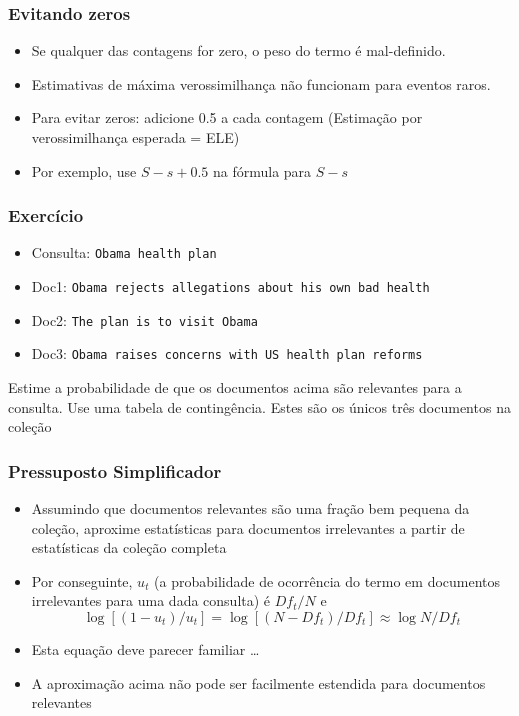 \documentclass[compress]{beamer}
\def\myblue#1{\textcolor{texblue}{#1}}
\begin{document}
\begin{frame}[<+->]
\frametitle{Evitando zeros}
\pause[2]

\begin{itemize}
\item Se qualquer das contagens for zero, o peso do termo é mal-definido.
\item Estimativas de máxima verossimilhança não funcionam para eventos raros.
\item Para evitar zeros: \myblue{adicione 0.5 a cada contagem}
  (Estimação por verossimilhança esperada = ELE)
\item Por exemplo, use $S-s+0.5$ na fórmula para $S-s$
\end{itemize}

\end{frame}

\begin{frame}
\frametitle{Exercício}
\pause

\begin{itemize}
\item Consulta: \texttt{Obama health plan}
\item Doc1: \texttt{Obama rejects allegations about his own bad health}
\item Doc2: \texttt{The plan is to visit Obama}
\item Doc3: \texttt{Obama raises concerns with US health plan reforms}
\end{itemize}
\pause
Estime a probabilidade de que os documentos acima são relevantes para a consulta. Use uma tabela de contingência. Estes são os únicos três documentos na coleção
\end{frame} 

\begin{frame}[<+->]
\frametitle{Pressuposto Simplificador}
\pause[2]

\begin{itemize}\item Assumindo que documentos relevantes são uma fração bem pequena da coleção, aproxime estatísticas para documentos irrelevantes a partir de estatísticas da coleção completa

\item Por conseguinte, $u_t$ (a probabilidade de ocorrência do termo em documentos irrelevantes para uma dada consulta) é $Df_t/N$ e
\begin{equation}
\nonumber
\log [(1-u_t)/u_t] = \log [(N-Df_t)/Df_t] \approx \log N/Df_t 
\end{equation}

\item Esta equação deve parecer familiar \ldots

\item A aproximação acima não pode ser facilmente estendida para documentos relevantes
\end{itemize}
\end{frame}
\end{document}
